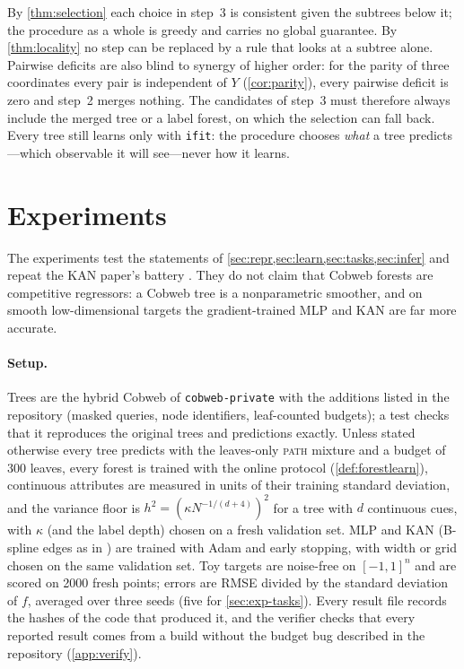 \documentclass[11pt]{article}
\theoremstyle{definition}
\theoremstyle{remark}
\begin{document}
By \cref{thm:selection} each choice in step~3 is consistent given the subtrees below it;
the procedure as a whole is greedy and carries no global guarantee.  By
\cref{thm:locality} no step can be replaced by a rule that looks at a subtree alone.
Pairwise deficits are also blind to synergy of higher order: for the parity of three
coordinates every pair is independent of $Y$ (\cref{cor:parity}), every pairwise deficit
is zero and step~2 merges nothing.  The candidates of step~3 must therefore always
include the merged tree or a label forest, on which the selection can fall back.
Every tree still learns only with \texttt{ifit}: the procedure chooses \emph{what} a tree
predicts---which observable it will see---never how it learns.

\section{Experiments}\label{sec:experiments}

The experiments test the statements of \cref{sec:repr,sec:learn,sec:tasks,sec:infer}
and repeat the KAN paper's battery \citep{liu2024kan}.  They do not claim that Cobweb
forests are competitive regressors: a Cobweb tree is a nonparametric smoother, and on
smooth low-dimensional targets the gradient-trained MLP and KAN are far more accurate.

\paragraph{Setup.}
Trees are the hybrid Cobweb of \texttt{cobweb-private} with the additions listed in the
repository (masked queries, node identifiers, leaf-counted budgets); a test checks that
it reproduces the original trees and predictions exactly.  Unless stated otherwise every
tree predicts with the leaves-only \textsc{path} mixture and a budget of 300 leaves,
every forest is trained with the online protocol (\cref{def:forestlearn}), continuous
attributes are measured in units of their training standard deviation, and the variance
floor is $h^2=(\kappa N^{-1/(d+4)})^2$ for a tree with $d$ continuous cues, with
$\kappa$ (and the label depth) chosen on a fresh validation set.  MLP and KAN (B-spline
edges as in \citet{liu2024kan}) are trained with Adam and early stopping, with width or
grid chosen on the same validation set.  Toy targets are noise-free on $[-1,1]^n$ and
are scored on 2000 fresh points; errors are RMSE divided by the standard deviation of
$f$, averaged over three seeds (five for \cref{sec:exp-tasks}).  Every result file
records the hashes of the code that produced it, and the verifier checks that every
reported result comes from a build without the budget bug described in the repository
(\cref{app:verify}).
\end{document}

